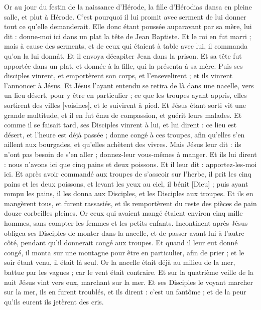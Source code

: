 \begin{multicols}{2}
Or au jour du festin de la naissance d'Hérode, la fille d'Hérodias dansa en pleine salle, et plut à Hérode.
C'est pourquoi il lui promit avec serment de lui donner tout ce qu'elle demanderait.
Elle donc étant poussée auparavant par sa mère, lui dit : donne-moi ici dans un plat la tête de Jean Baptiste.
Et le roi en fut marri ; mais à cause des serments, et de ceux qui étaient à table avec lui, il commanda qu'on la lui donnât.
Et il envoya décapiter Jean dans la prison.
Et sa tête fut apportée dans un plat, et donnée à la fille, qui la présenta à sa mère.
Puis ses disciples vinrent, et emportèrent son corps, et l'ensevelirent ; et ils vinrent l'annoncer à Jésus.
Et Jésus l'ayant entendu se retira de là dans une nacelle, vers un lieu désert, pour y être en particulier ; ce que les troupes ayant appris, elles sortirent des villes [voisines], et le suivirent à pied.
Et Jésus étant sorti vit une grande multitude, et il en fut ému de compassion, et guérit leurs malades.
Et comme il se faisait tard, ses Disciples vinrent à lui, et lui dirent : ce lieu est désert, et l'heure est déjà passée ; donne congé à ces troupes, afin qu'elles s'en aillent aux bourgades, et qu'elles achètent des vivres.
Mais Jésus leur dit : ils n'ont pas besoin de s'en aller ; donnez-leur vous-mêmes à manger.
Et ils lui dirent : nous n'avons ici que cinq pains et deux poissons.
Et il leur dit : apportez-les-moi ici.
Et après avoir commandé aux troupes de s'asseoir sur l'herbe, il prit les cinq pains et les deux poissons, et levant les yeux au ciel, il bénit [Dieu] ; puis ayant rompu les pains, il les donna aux Disciples, et les Disciples aux troupes.
Et ils en mangèrent tous, et furent rassasiés, et ils remportèrent du reste des pièces de pain douze corbeilles pleines.
Or ceux qui avaient mangé étaient environ cinq mille hommes, sans compter les femmes et les petits enfants.
Incontinent après Jésus obligea ses Disciples de monter dans la nacelle, et de passer avant lui à l'autre côté, pendant qu'il donnerait congé aux troupes.
Et quand il leur eut donné congé, il monta sur une montagne pour être en particulier, afin de prier ; et le soir étant venu, il était là seul.
Or la nacelle était déjà au milieu de la mer, battue par les vagues ; car le vent était contraire.
Et sur la quatrième veille de la nuit Jésus vint vers eux, marchant sur la mer.
Et ses Disciples le voyant marcher sur la mer, ils en furent troublés, et ils dirent : c'est un fantôme ; et de la peur qu'ils eurent ils jetèrent des cris.

\end{multicols}

